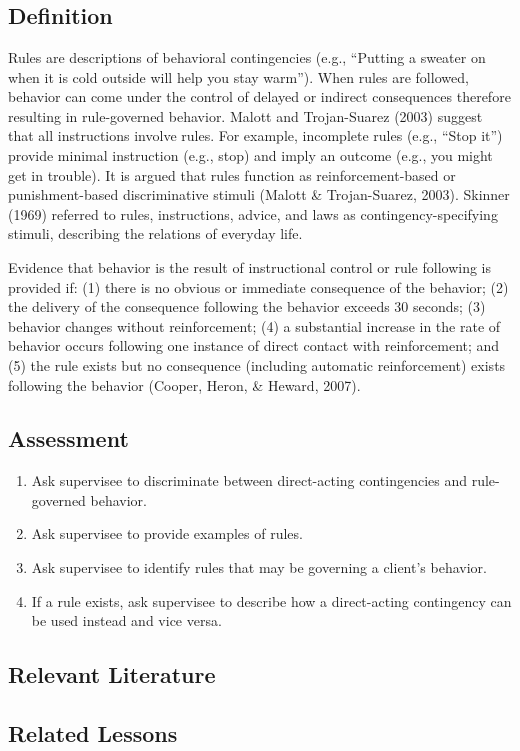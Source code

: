 \clearpage \section{\foureThree{}}
\subsection{Definition}
Rules are descriptions of behavioral contingencies (e.g., ``Putting a sweater on when it is cold outside will help you stay warm'').  When rules are followed, behavior can come under the control of delayed or indirect consequences therefore resulting in rule-governed behavior.  Malott and Trojan-Suarez (2003) suggest that all instructions involve rules.  For example, incomplete rules (e.g., ``Stop it'') provide minimal instruction (e.g., stop) and imply an outcome (e.g., you might get in trouble).   It is argued that rules function as reinforcement-based or punishment-based discriminative stimuli (Malott \& Trojan-Suarez, 2003). Skinner (1969) referred to rules, instructions, advice, and laws as contingency-specifying stimuli, describing the  relations of everyday life.

Evidence that behavior is the result of instructional control or rule following is provided if: (1) there is no obvious or immediate consequence of the behavior; (2) the delivery of the consequence following the behavior exceeds 30 seconds; (3) behavior changes without reinforcement; (4) a substantial increase in the rate of behavior occurs following one instance of direct contact with reinforcement; and (5) the rule exists but no consequence (including automatic reinforcement) exists following the behavior (Cooper, Heron, \& Heward, 2007).
%
\subsection{Assessment}
\begin{enumerate}
\item Ask supervisee to discriminate between direct-acting contingencies and rule-governed behavior.
\item Ask supervisee to provide examples of rules.
\item Ask supervisee to identify rules that may be governing a client's behavior.
\item If a rule exists, ask supervisee to describe how a direct-acting contingency can be used instead and vice versa.
\end{enumerate}
%
\subsection{Relevant Literature}
\begin{refsection}
\nocite{cooper2007applied,
        hayes2004rule,
        malott2003principles,
        skinner1969contingencies}
\printbibliography[heading=none]
\end{refsection}
%
\subsection{Related Lessons}
\fourdOne{}\\
\fourdSixteen{}\\
\fourkTwo{}\\
\fourFKThirty{}\\
\fourFKThirtyOne{}\\
\fourFKThirtyThree{}\\
\fourFKFourtyOne{}\\
\fourFKFourtyTwo{}\\

